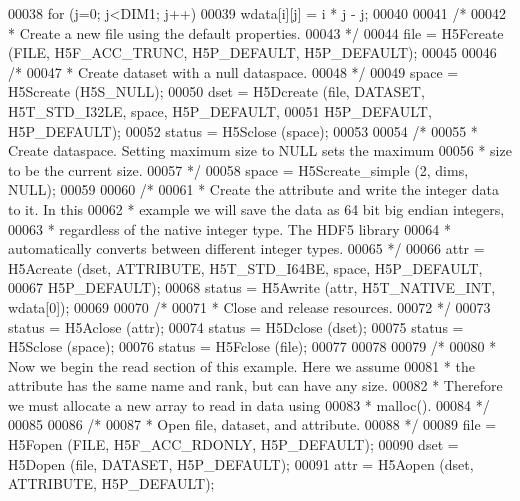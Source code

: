 \begin{DoxyCode}
00038         \textcolor{keywordflow}{for} (j=0; j<DIM1; j++)
00039             wdata[i][j] = i * j - j;
00040 
00041     \textcolor{comment}{/*}
00042 \textcolor{comment}{     * Create a new file using the default properties.}
00043 \textcolor{comment}{     */}
00044     file = H5Fcreate (FILE, H5F\_ACC\_TRUNC, H5P\_DEFAULT, H5P\_DEFAULT);
00045 
00046     \textcolor{comment}{/*}
00047 \textcolor{comment}{     * Create dataset with a null dataspace.}
00048 \textcolor{comment}{     */}
00049     space = H5Screate (H5S\_NULL);
00050     dset = H5Dcreate (file, DATASET, H5T\_STD\_I32LE, space, H5P\_DEFAULT,
00051                 H5P\_DEFAULT, H5P\_DEFAULT);
00052     status = H5Sclose (space);
00053 
00054     \textcolor{comment}{/*}
00055 \textcolor{comment}{     * Create dataspace.  Setting maximum size to NULL sets the maximum}
00056 \textcolor{comment}{     * size to be the current size.}
00057 \textcolor{comment}{     */}
00058     space = H5Screate\_simple (2, dims, NULL);
00059 
00060     \textcolor{comment}{/*}
00061 \textcolor{comment}{     * Create the attribute and write the integer data to it.  In this}
00062 \textcolor{comment}{     * example we will save the data as 64 bit big endian integers,}
00063 \textcolor{comment}{     * regardless of the native integer type.  The HDF5 library}
00064 \textcolor{comment}{     * automatically converts between different integer types.}
00065 \textcolor{comment}{     */}
00066     attr = H5Acreate (dset, ATTRIBUTE, H5T\_STD\_I64BE, space, H5P\_DEFAULT,
00067                 H5P\_DEFAULT);
00068     status = H5Awrite (attr, H5T\_NATIVE\_INT, wdata[0]);
00069 
00070     \textcolor{comment}{/*}
00071 \textcolor{comment}{     * Close and release resources.}
00072 \textcolor{comment}{     */}
00073     status = H5Aclose (attr);
00074     status = H5Dclose (dset);
00075     status = H5Sclose (space);
00076     status = H5Fclose (file);
00077 
00078 
00079     \textcolor{comment}{/*}
00080 \textcolor{comment}{     * Now we begin the read section of this example.  Here we assume}
00081 \textcolor{comment}{     * the attribute has the same name and rank, but can have any size.}
00082 \textcolor{comment}{     * Therefore we must allocate a new array to read in data using}
00083 \textcolor{comment}{     * malloc().}
00084 \textcolor{comment}{     */}
00085 
00086     \textcolor{comment}{/*}
00087 \textcolor{comment}{     * Open file, dataset, and attribute.}
00088 \textcolor{comment}{     */}
00089     file = H5Fopen (FILE, H5F\_ACC\_RDONLY, H5P\_DEFAULT);
00090     dset = H5Dopen (file, DATASET, H5P\_DEFAULT);
00091     attr = H5Aopen (dset, ATTRIBUTE, H5P\_DEFAULT);

\end{DoxyCode}
